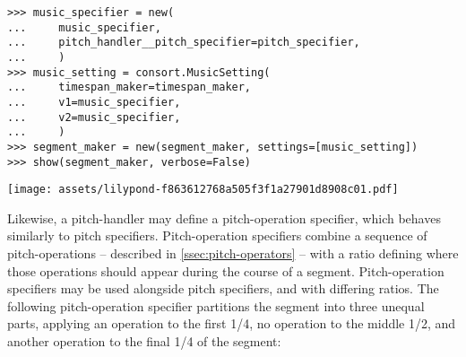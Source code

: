 \begin{abjadbookoutput}
\begin{singlespacing}
\vspace{-0.5\baselineskip}
\begin{lstlisting}
>>> music_specifier = new(
...     music_specifier,
...     pitch_handler__pitch_specifier=pitch_specifier,
...     )
>>> music_setting = consort.MusicSetting(
...     timespan_maker=timespan_maker,
...     v1=music_specifier,
...     v2=music_specifier,
...     )
>>> segment_maker = new(segment_maker, settings=[music_setting])
>>> show(segment_maker, verbose=False)
\end{lstlisting}
\noindent\texttt{[image: assets/lilypond-f863612768a505f3f1a27901d8908c01.pdf]}
\end{singlespacing}
\end{abjadbookoutput}

\noindent Likewise, a pitch-handler may define a pitch-operation specifier,
which behaves similarly to pitch specifiers. Pitch-operation specifiers combine
a sequence of pitch-operations -- described in \autoref{ssec:pitch-operators}
-- with a ratio defining where those operations should appear during the course
of a segment. Pitch-operation specifiers may be used alongside pitch
specifiers, and with differing ratios. The following pitch-operation specifier
partitions the segment into three unequal parts, applying an operation to the
first 1/4, no operation to the middle 1/2, and another operation to the final
1/4 of the segment:

\begin{comment}
<abjad>[stylesheet=../consort.ily]
music_specifier = new(
    music_specifier,
    pitch_handler__pitch_operation_specifier=consort.PitchOperationSpecifier(
        pitch_operations=(
            pitchtools.PitchOperation((
                pitchtools.Inversion(),
                )),
            None,
            pitchtools.PitchOperation((
                pitchtools.Rotation(-1),
                pitchtools.Transposition(-1),
                ))
            ),
        ratio=(1, 2, 1),
        ),
    )
music_setting = consort.MusicSetting(
    timespan_maker=timespan_maker,
    v1=music_specifier,
    v2=music_specifier,
    )
segment_maker = new(segment_maker, settings=[music_setting])
show(segment_maker, verbose=False)
</abjad>
\end{comment}

